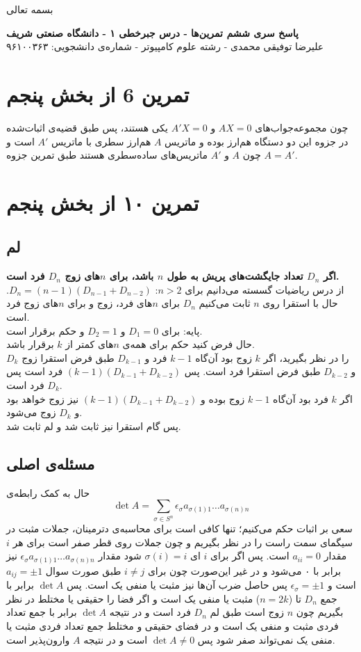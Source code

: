 \documentclass[12pt,a4paper]{article}
\begin{document}
\begin{center}
	بسمه تعالی
\end{center}

\begin{center}
	\textbf{
		پاسخ سری ششم تمرین‌ها
		- درس جبرخطی ۱ - دانشگاه صنعتی شریف}
	\\
	علیرضا توفیقی محمدی - رشته علوم کامپیوتر - شماره‌ی دانشجویی: ۹۶۱۰۰۳۶۳
\end{center}

\section{تمرین 6 از بخش پنجم}
چون مجموعه‌جواب‌های $AX = 0$ و $A'X = 0$ یکی هستند، پس  طبق قضیه‌ی اثبات‌شده در جزوه این دو دستگاه هم‌ارز بوده و ماتریس $A$ هم‌ارز سطری با ماتریس $A'$ است و چون $A$ و $A'$ ماتریس‌های ساده‌سطری هستند طبق تمرین جزوه $A = A'$.
\section{تمرین ۱۰ از بخش پنجم}
\subsection{لم}
\textbf{
اگر $D_n$ تعداد جایگشت‌های پریش به طول $n$ باشد، برای $n$های زوج $D_n$ فرد است.
}
\\
از درس ریاضیات گسسته می‌دانیم برای $n > 2$:
$D_n = (n-1)(D_{n-1}+D_{n-2})$.
حال با استقرا روی $n$ ثابت می‌کنیم $D_n$ برای $n$های فرد، زوج و برای $n$های زوج فرد است.
\\
پایه:
برای $D_1 = 0$ و $D_2 = 1$ و حکم برقرار است.
\\
حال فرض کنید حکم برای همه‌ی $n$های کمتر از $k$ برقرار باشد.
\\
$D_k$
را در نظر بگیرید، اگر $k$ زوج بود آن‌گاه $k-1$ فرد و $D_{k-1}$ طبق فرض استقرا زوج و $D_{k-2}$ طبق فرض استقرا فرد است. پس 
$(k-1)(D_{k-1}+D_{k-2})$
فرد است پس $D_k$ فرد است.
\\
اگر $k$ فرد بود آن‌گاه $k-1$ زوج بوده و $(k-1)(D_{k-1}+D_{k-2})$ نیز زوج خواهد بود و $D_k$ زوج می‌شود.
\\
پس گام استقرا نیز ثابت شد و لم ثابت شد.
\subsection{مسئله‌ی اصلی}
حال به کمک رابطه‌ی 
$$\det A = \sum_{\sigma \in S^n} \epsilon_\sigma a_{\sigma(1)1}\dots a_{\sigma(n)n}$$
سعی بر اثبات حکم می‌کنیم؛ تنها کافی است برای محاسبه‌ی دترمینان، جملات مثبت در سیگمای سمت راست را در نظر بگیریم و چون جملات روی قطر صفر است برای هر $i$ مقدار $a_{ii} = 0$ است. پس اگر برای $i$ ای 
$\sigma(i) = i$
شود مقدار 
$\epsilon_\sigma a_{\sigma(1)1}\dots a_{\sigma(n)n}$
نیز برابر با ۰ می‌شود و در غیر این‌صورت چون برای $i\neq j$ طبق صورت سوال 
$a_{ij} = \pm1$
است و $\epsilon_\sigma = \pm 1$ پس حاصل ضرب آن‌ها نیز مثبت یا منفی یک است.
پس $\det A$ برابر با جمع $D_n$ تا ($n = 2k$) مثبت یا منفی یک است و اگر فضا را حقیقی یا مختلط در نظر بگیریم چون $n$ زوج است طبق لم $D_n$ فرد است و در نتیجه $\det A$ برابر با جمع تعداد فردی مثبت و منفی یک است و در فضای حقیقی و مختلط جمع تعداد فردی مثبت یا منفی یک نمی‌تواند صفر شود پس $\det A \neq 0$ است و در نتیجه $A$ وارون‌پذیر است.
\end{document}
